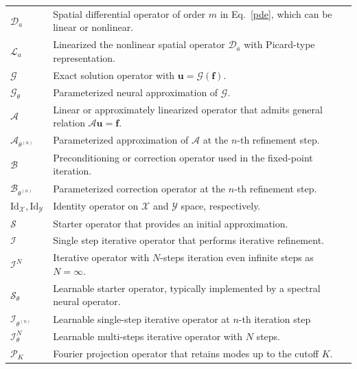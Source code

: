 \documentclass[preprint,numbers,sort&compress]{elsarticle}
\begin{document}
\begin{table}[t]
\begin{tabular}{ll}
				$\mathcal{D}_a$ & Spatial differential operator of order $m$ in Eq.~\eqref{pde}, which can be linear or nonlinear.  \\
				$\mathcal L_{a}$ & Linearized the nonlinear spatial operator $\mathcal{D}_a$ with Picard-type representation. \\
				$\mathcal G$ & Exact solution operator with $\boldsymbol u=\mathcal G(\boldsymbol f)$. \\
				$\mathcal G_\theta$ & Parameterized neural approximation of $\mathcal G$. \\
				$\mathcal A$ & Linear or approximately linearized  operator that admits general relation $\mathcal A\boldsymbol u=\boldsymbol f$. \\
				$\mathcal A_{\theta^{(n)}}$ & Parameterized approximation of $\mathcal A$ at the $n$-th refinement step. \\
				$\mathcal B$ & Preconditioning or correction operator used in the fixed-point iteration. \\
				$\mathcal B_{\theta^{(n)}}$ & Parameterized correction operator at the $n$-th refinement step. \\
				
				$\mathrm{Id}_{\mathcal X},\mathrm{Id}_{\mathcal Y}$ & Identity operator on $\mathcal X$ and $\mathcal Y$ space, respectively. \\
				
				$\mathcal S$ & Starter operator that provides an initial approximation. \\
				
				$\mathcal I$ & Single step iterative operator that performs iterative refinement. \\
				
				$\mathcal I^{N}$ &  Iterative operator with $N$-steps iteration even infinite steps as $N=\infty$. \\
				
				$\mathcal S_\theta$ & Learnable starter operator, typically implemented by a spectral neural operator. \\
				
				$\mathcal I_{\theta^{(n)}}$ & Learnable single-step iterative operator at $n$-th iteration step \\
				$\mathcal I_\theta^{N}$ & Learnable multi-steps iterative operator with $N$ steps. \\
				$\mathcal P_K$ & Fourier projection operator that retains modes up to the cutoff $K$. \\
				

\end{tabular}
\end{table}
\end{document}
